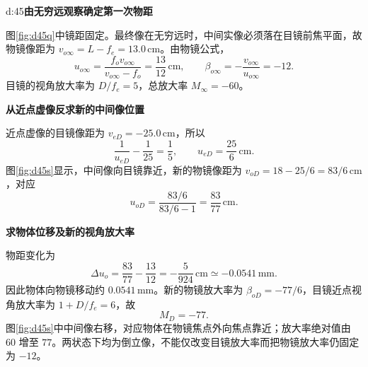 \begin{drillsolution}{d:45}\textbf{由无穷远观察确定第一次物距}\par\nobreak
图\ref{fig:d45q}中镜距固定。最终像在无穷远时，中间实像必须落在目镜前焦平面，故物镜像距为 $v_{o\infty}=L-f_e=13.0\,\mathrm{cm}$。由物镜公式，
\[
u_{o\infty}=\frac{f_ov_{o\infty}}{v_{o\infty}-f_o}
=\frac{13}{12}\,\mathrm{cm},\qquad
\beta_{o\infty}=-\frac{v_{o\infty}}{u_{o\infty}}=-12.
\]
目镜的视角放大率为 $D/f_e=5$，总放大率 $\boxed{M_\infty=-60}$。

\par\medskip{}\noindent\textbf{从近点虚像反求新的中间像位置}\par\nobreak
近点虚像的目镜像距为 $v_{eD}=-25.0\,\mathrm{cm}$，所以
\[
\frac1{u_{eD}}-\frac1{25}=\frac15,
\qquad u_{eD}=\frac{25}{6}\,\mathrm{cm}.
\]
图\ref{fig:d45s}显示，中间像向目镜靠近，新的物镜像距为
$v_{oD}=18-25/6=83/6\,\mathrm{cm}$，对应
\[
u_{oD}=\frac{83/6}{83/6-1}=\frac{83}{77}\,\mathrm{cm}.
\]

\par\medskip{}\noindent\textbf{求物体位移及新的视角放大率}\par\nobreak
物距变化为
\[
\Delta u_o=\frac{83}{77}-\frac{13}{12}
=-\frac5{924}\,\mathrm{cm}\simeq-0.0541\,\mathrm{mm}.
\]
因此物体向物镜移动约 $0.0541\,\mathrm{mm}$。新的物镜放大率为 $\beta_{oD}=-77/6$，目镜近点视角放大率为 $1+D/f_e=6$，故
\[
\boxed{M_D=-77}.
\]
图\ref{fig:d45s}中中间像右移，对应物体在物镜焦点外向焦点靠近；放大率绝对值由 $60$ 增至 $77$。两状态下均为倒立像，不能仅改变目镜放大率而把物镜放大率仍固定为 $-12$。
\end{drillsolution}
